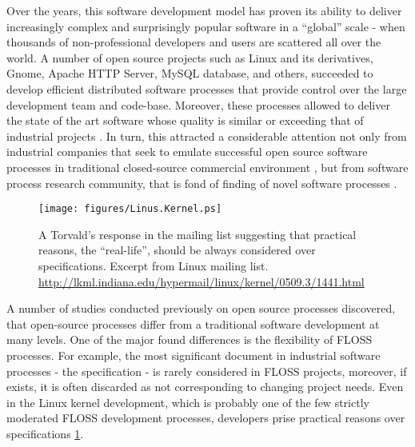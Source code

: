 Over the years, this software development model has proven its ability to deliver increasingly complex 
and surprisingly popular software in a ``global'' scale - when thousands of non-professional developers 
and users are scattered all over the world. A number of open source projects such as Linux and its 
derivatives, Gnome, Apache HTTP Server, MySQL database, and others, succeeded to develop efficient 
distributed software processes that provide control over the large development team and code-base.
Moreover, these processes allowed to deliver the state of the art software whose quality is similar 
or exceeding that of industrial projects \cite{coverity2012}. 
In turn, this attracted a considerable attention not only from industrial companies that seek to emulate 
successful open source software processes in traditional closed-source commercial environment 
\cite{oss_virtual_organizations} \cite{oss_balance} \cite{oss_hp} \cite{oss_4industry}, 
but from software process research community, that is fond of finding of novel software processes
\cite{citeulike:12550640} \cite{citeulike:5043664} \cite{citeulike:5128808} \cite{citeulike:10377366}.

\begin{figure}[ht!]
   \centering
   \texttt{[image: figures/Linus.Kernel.ps]}
   \caption{A Torvald's response in the mailing list suggesting that practical reasons, the ``real-life'', 
   should be always considered over specifications.
   Excerpt from Linux mailing list. \url{http://lkml.indiana.edu/hypermail/linux/kernel/0509.3/1441.html}}
   \label{fig:kernel}
\end{figure}

A number of studies conducted previously on open source processes discovered, that open-source processes 
differ from a traditional software development at many levels. One of the major found differences 
is the flexibility of FLOSS processes. For example, the most significant document in industrial software 
processes - the specification - is rarely considered in FLOSS projects, moreover, if exists, it is often 
discarded as not corresponding to changing project needs. Even in the Linux kernel development, which is 
probably one of the few strictly moderated FLOSS development processes, developers prise practical reasons 
over specifications \ref{fig:kernel}.

